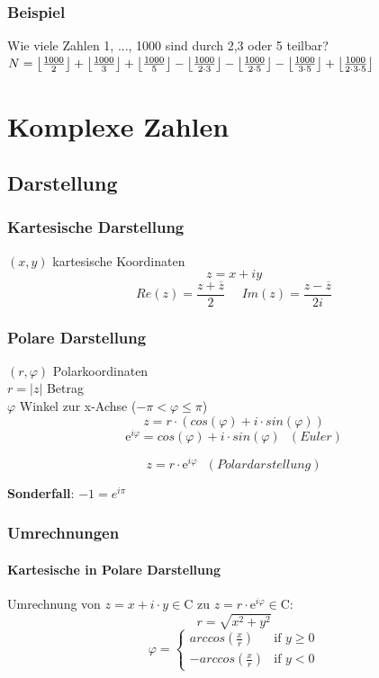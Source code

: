 \documentclass[10pt,a4paper,landscape]{article}
\DeclarePairedDelimiter\floor{\lfloor}{\rfloor}
\begin{document}
\begin{multicols*}{3}
		\subsubsection{Beispiel}
			Wie viele Zahlen 1, ..., 1000 sind durch 2,3 oder 5 teilbar?
			$N = \floor*{\frac{1000}{2}} + \floor*{\frac{1000}{3}} + \floor*{\frac{1000}{5}} - \floor*{\frac{1000}{2 \cdot 3}} - \floor*{\frac{1000}{2 \cdot 5}} - \floor*{\frac{1000}{3 \cdot 5}} + \floor*{\frac{1000}{2 \cdot 3 \cdot 5}}$
		
		
		\section{Komplexe Zahlen}
		\subsection{Darstellung}
		\subsubsection{Kartesische Darstellung}
		$(x, y)$ kartesische Koordinaten\\
		\[ z = x +iy \]
		\[
		Re(z) =  \frac{z + \overline{z}}{2} ~~~~~~ Im(z) = \frac{z - \overline{z}}{2i}
		\]
		
		\subsubsection{Polare Darstellung}
		$(r, \varphi)$ Polarkoordinaten\\
		$r = |z|$ Betrag\\
		$\varphi$ Winkel zur x-Achse ($-\pi < \varphi \leq \pi $) 
		\[ z = r \cdot (cos(\varphi) + i \cdot sin(\varphi))\]
		\[ \mathrm{e}^{i\varphi} = cos(\varphi) + i \cdot sin(\varphi) ~~~ (Euler)\]
		
		\[ z = r \cdot \mathrm{e}^{i\varphi} ~~~ (Polardarstellung) \]
		
		\textbf{Sonderfall}: $-1 = e^{i\pi}$
		
		\subsubsection{Umrechnungen}
		\paragraph{Kartesische in Polare Darstellung}
		Umrechnung von $z = x + i \cdot y \in \mathrm{C}$ zu  $z =  r \cdot \mathrm{e}^{i\varphi} \in \mathrm{C}$:
		\[ r = \sqrt{x^2 +y^2} \]
		\[ \varphi = \begin{cases} arccos(\frac{x}{r}) &\mbox{if } y \geq 0 \\ 
		- arccos(\frac{x}{r}) &\mbox{if } y < 0 \end{cases} \]
		

\end{multicols*}
\end{document}

